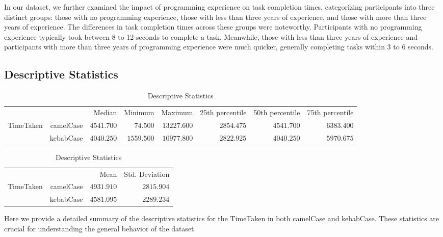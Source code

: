 \documentclass{article}
\begin{document}
In our dataset, we further examined the impact of programming experience on task completion times, categorizing participants into three distinct groups: those with no programming experience, those with less than three years of experience, and those with more than three years of experience. The differences in task completion times across these groups were noteworthy. Participants with no programming experience typically took between 8 to 12 seconds to complete a task. Meanwhile, those with less than three years of experience and participants with more than three years of programming experience were much quicker, generally completing tasks within 3 to 6 seconds.



\subsection{Descriptive Statistics}



\begin{table}[h]
	\centering
	\caption{Descriptive Statistics}
	\label{tab:descriptiveStatistics}
	{
		\begin{tabular}{lrrrrrrr}
			\toprule
			 &  & Median & Minimum & Maximum & 25th percentile & 50th percentile & 75th percentile  \\
			\cmidrule[0.4pt]{1-8}
			TimeTaken & camelCase & $4541.700$ & $74.500$ & $13227.600$ & $2854.475$ & $4541.700$ & $6383.400$  \\
			 & kebabCase & $4040.250$ & $1559.500$ & $10977.800$ & $2822.925$ & $4040.250$ & $5970.675$  \\
			\bottomrule
		\end{tabular}
	}
\end{table}

\begin{table}[h]
	\centering
	\caption{Descriptive Statistics}
	\label{tab:descriptiveStatistics}
	{
		\begin{tabular}{lrrr}
			\toprule
			 &  & Mean & Std. Deviation  \\
			\cmidrule[0.4pt]{1-4}
			TimeTaken & camelCase & $4931.910$ & $2815.904$  \\
			 & kebabCase & $4581.095$ & $2289.234$  \\
			\bottomrule
		\end{tabular}
	}
\end{table}

Here we provide a detailed summary of the descriptive statistics for the TimeTaken in both camelCase and kebabCase. These statistics are crucial for understanding the general behavior of the dataset.
\end{document}

